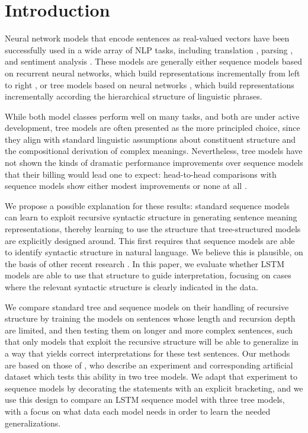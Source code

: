 \section{Introduction}\label{sec:intro}

Neural network models that encode sentences as real-valued vectors have been successfully used in a wide array of NLP tasks, including translation \cite{sutskever2014sequence}, parsing \cite{dyer2015transition}, and sentiment analysis \cite{tai2015improved}. 
These models are generally either 
sequence models based on recurrent neural networks, which build representations incrementally from left to right \cite{elman1990finding,sutskever2014sequence}, or tree models based on  neural networks \cite{goller1996learning,socher2011semi}, which build representations incrementally according the hierarchical structure of linguistic phrases. 

While both model classes perform %
well on many tasks, and both are under active development,
tree models are often presented as the more principled choice, since they align with standard linguistic assumptions about constituent structure and the compositional derivation of complex meanings.
Nevertheless,
tree models have not shown the kinds of dramatic performance improvements over sequence models that their billing would lead one to expect: head-to-head comparisons with sequence models show either modest improvements \cite{tai2015improved} or none at all \cite{li2015tree}. 

We propose a possible explanation for these results: standard sequence models can learn to
exploit recursive syntactic structure in generating sentence meaning representations, thereby 
learning to use the 
structure that tree-structured models are explicitly designed around. This first requires that
sequence models are able to identify syntactic structure in natural language. We believe this is plausible, on the basis of other recent research \cite{Karpathy2015vaurn}. %
In this paper, we  evaluate whether LSTM models are able to use that structure to guide interpretation, 
focusing on cases where the relevant syntactic structure is clearly indicated in the data.

We compare standard tree and sequence models on their handling of recursive structure by training the models on sentences whose length and recursion depth are limited, and then testing them on longer and more complex sentences, such that only models that exploit the recursive structure will be able to generalize in a way that yields correct interpretations for these test sentences. Our methods are based on those of , who describe an experiment and corresponding artificial dataset which tests this ability in two tree models. We adapt that experiment to sequence models by decorating the statements with an explicit bracketing, and we use this design to compare an LSTM sequence model with three tree models, with a focus on what data each model needs in order to learn the needed generalizations.

